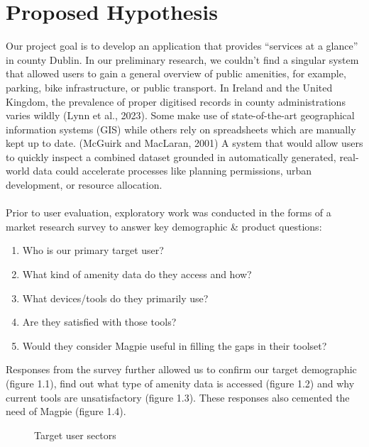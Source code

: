 \documentclass{report}
\begin{document}
\section{Proposed Hypothesis}
Our project goal is to develop an application that provides “services at a glance” in county Dublin. In our preliminary research, we couldn’t find a singular system that allowed users to gain a general overview of public amenities, for example, parking, bike infrastructure, or public transport. In Ireland and the United Kingdom, the prevalence of proper digitised records in county administrations varies wildly (Lynn et al., 2023). Some make use of state-of-the-art geographical information systems (GIS) while others rely on spreadsheets which are manually kept up to date. (McGuirk and MacLaran, 2001) A system that would allow users to quickly inspect a combined dataset grounded in automatically generated, real-world data could accelerate processes like planning permissions, urban development, or resource allocation.\\ \\
Prior to user evaluation, exploratory work was conducted in the forms of a market research survey to answer key demographic \& product questions:
\begin{enumerate}
    \item Who is our primary target user?
    \item What kind of amenity data do they access and how?
    \item What devices/tools do they primarily use?
    \item Are they satisfied with those tools?
    \item Would they consider Magpie useful in filling the gaps in their toolset?
\end{enumerate}
Responses from the survey further allowed us to confirm our target demographic (figure 1.1), find out what type of amenity data  is accessed (figure 1.2) and why current tools are unsatisfactory (figure 1.3). These responses also cemented the need of Magpie (figure 1.4).
\begin{figure}[h]
    \centering
    \caption{Target user sectors}
    \label{fig:yourlabel}
\end{figure}
\end{document}
